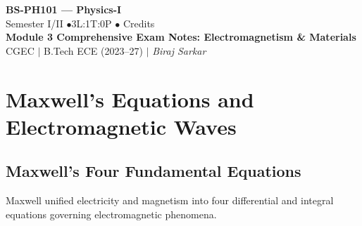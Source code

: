 \documentclass[12pt,a4paper]{article}
\begin{document}
\begin{center}
  {\LARGE\bfseries\color{myred} BS-PH101 --- Physics-I}\\[5pt]
  {\normalsize\color{mydark} Semester I/II \quad$\bullet$\quad 3L:1T:0P \quad$\bullet$ Credits}\\[3pt]
  {\normalsize\color{myteal}\textbf{Module 3 Comprehensive Exam Notes: Electromagnetism \& Materials}}\\[3pt]
  {\small\color{mydark} CGEC \;$|$\; B.Tech ECE (2023--27) \;$|$\; \textit{Biraj Sarkar}}
\end{center}
\vspace{2pt}
\noindent{\color{myred}\rule{\linewidth}{1.5pt}}
\vspace{2pt}
\hypersetup{linkcolor=mydark}
\tableofcontents
\hypersetup{linkcolor=myteal}
\newpage

\section{Maxwell's Equations and Electromagnetic Waves}

\subsection{Maxwell's Four Fundamental Equations}

Maxwell unified electricity and magnetism into four differential and integral equations governing electromagnetic phenomena.
\end{document}
